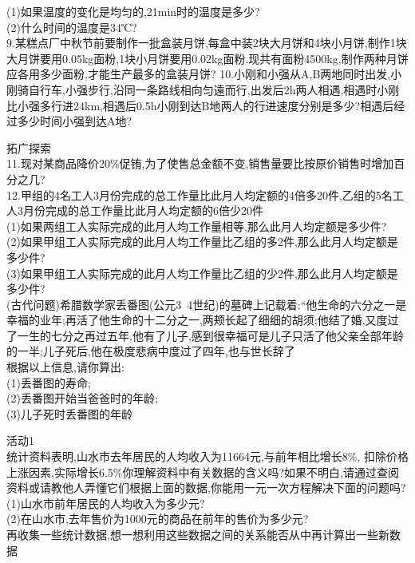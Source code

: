 \documentclass[11pt,apaper]{article}
\begin{document}
\begin{exercise}
(1)如果温度的变化是均匀的,21min时的温度是多少?\\
(2)什么时间的温度是34℃?\\
9.某糕点厂中秋节前要制作一批盒装月饼,每盒中装2块大月饼和4块小月饼,制作1块大月饼要用0.05kg面粉,1块小月饼要用0.02kg面粉.现共有面粉4500kg,制作两种月饼应各用多少面粉,才能生产最多的盒装月饼?
10.小刚和小强从A,B两地同时出发,小刚骑自行车,小强步行,沿同一条路线相向匀遠而行,出发后2h两人相遇,相遇时小刚比小强多行进24km,相遇后0.5h小刚到达B地两人的行进速度分别是多少?相遇后经过多少时间小强到达A地?\\

\end{exercise}




\begin{framed}
拓广探索\\

11.现对某商品降价20\%促铕,为了使售总金额不变,销售量要比按原价销售时增加百分之几?\\
12.甲组的4名工人3月份完成的总工作量比此月人均定额的4倍多20件,乙组的5名工人3月份完成的总工作量比此月人均定额的6倍少20件\\
(1)如果两组工人实际完成的此月人均工作量相等,那么此月人均定额是多少件?\\
(2)如果甲组工人实际完成的此月人均工作量比乙组的多2件,那么此月人均定额是多少件?\\
(3)如果甲组工人实际完成的此月人均工作量比乙组的少2件,那么此月人均定额是多少件?\\
(古代问题)希腊数学家丢番图(公元3~4世纪)的墓碑上记载着:“他生命的六分之一是幸福的业年;再活了他生命的十二分之一,两颊长起了细细的胡须;他结了婚,又度过了一生的七分之再过五年,他有了儿子,感到很幸福可是儿子只活了他父亲全部年龄的一半;儿子死后,他在极度悲病中度过了四年,也与世长辞了\\
根据以上信息,请你算出:\\
(1)丢番图的寿命;\\
(2)丢番图开始当爸爸时的年龄;\\
(3)儿子死时丢番图的年龄\\

\end{framed}


\begin{framed}
活动1\\

统计资料表明,山水市去年居民的人均收入为11664元,与前年相比增长8\%, 扣除价格上涨因素,实际增长6.5\%你理解资料中有关数据的含义吗?如果不明白,请通过查阅资料或请教他人弄懂它们根据上面的数据,你能用一元一次方程解决下面的问题吗?\\
(1)山水市前年居民的人均收入为多少元?\\
(2)在山水市,去年售价为1000元的商品在前年的售价为多少元?\\
再收集一些统计数据,想一想利用这些数据之间的关系能否从中再计算出一些新数据\\
\end{framed}
\end{document}
